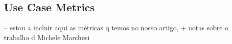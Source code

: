 \subsection{Use Case Metrics}

-- estou a incluir aqui as métricas q temos no nosso artigo, + notas sobre o trabalho d Michele Marchesi
